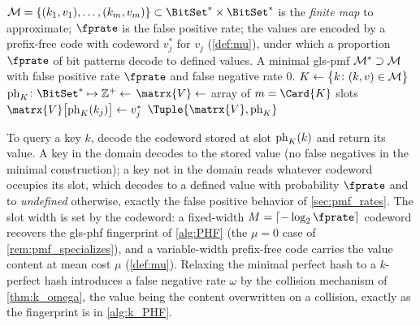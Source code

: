 \documentclass[ ../main.tex]{subfiles}
\begin{document}
\begin{algorithm}[h]
    \caption{Construction of the minimal \gls{gls-pmf}}
    \label{alg:shmap}
    \KwIn
    {
        $\Mt = \{(k_1,v_1),\ldots,(k_m,v_m)\} \subset \BitSet^* \times \BitSet^*$ is the \emph{finite map} to approximate; $\fprate$ is the false positive rate; the values are encoded by a prefix-free code with codeword $v_j^*$ for $v_j$ (\cref{def:mu}), under which a proportion $\fprate$ of bit patterns decode to defined values.
    }
    \KwOut
    {
        A minimal \gls{gls-pmf} $\mathcal{M}^* \supset \mathcal{M}$ with false positive rate $\fprate$ and false negative rate $0$.
    }
    \func{\MakeApproxMap{$\Mt$, $\fprate$}}
    {
        $K \gets \left\{k \colon (k,v) \in \mathcal{M}\right\}$\;
        $\ph_{K} \colon \BitSet^* \mapsto \mathbb{Z}^+ \gets$ \;
        $\matrx{V} \gets$ array of $m = \Card{K}$ slots\;
        {
            $\matrx{V}\!\left[\ph_{K}(k_j)\right] \gets v_j^*$\;
        }
        \Return $\Tuple{\matrx{V}, \ph_K}$\;
    }
\end{algorithm}

To query a key $k$, decode the codeword stored at slot $\operatorname{ph}_K(k)$ and return its
value. A key in the domain decodes to the stored value (no false negatives in the
minimal construction); a key not in the domain reads whatever codeword occupies
its slot, which decodes to a defined value with probability $\fprate$ and to
\emph{undefined} otherwise, exactly the false positive behavior of
\cref{sec:pmf_rates}. The slot width is set by the codeword: a fixed-width
$M = \lceil -\log_2\fprate \rceil$ codeword recovers the \gls{gls-phf} fingerprint
of \cref{alg:PHF} (the $\mu = 0$ case of \cref{rem:pmf_specializes}), and a
variable-width prefix-free code carries the value content at mean cost $\mu$
(\cref{def:mu}). Relaxing the minimal perfect hash to a $k$-perfect hash
introduces a false negative rate $\omega$ by the collision mechanism of
\cref{thm:k_omega}, the value being the content overwritten on a collision,
exactly as the fingerprint is in \cref{alg:k_PHF}.
\end{document}

